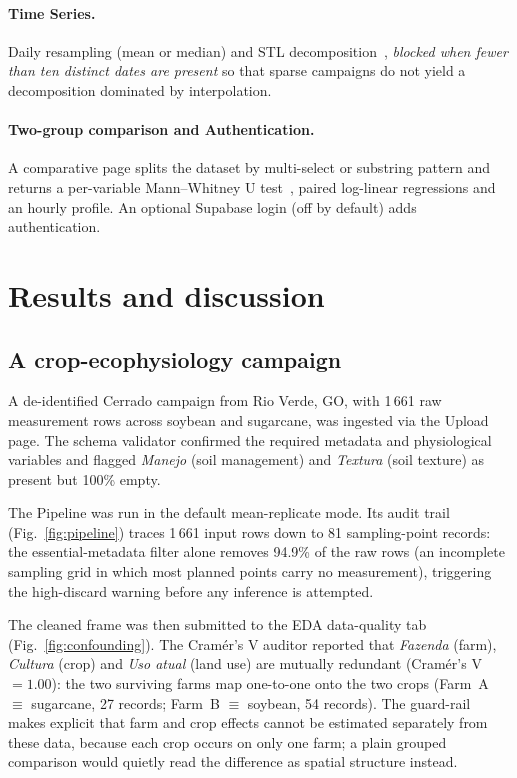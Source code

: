 \documentclass[11pt, letterpaper]{article}
\begin{document}
\paragraph{Time Series.} Daily resampling (mean or median) and STL decomposition~\cite{Cleveland1990STL}, \emph{blocked when fewer than ten distinct dates are present} so that sparse campaigns do not yield a decomposition dominated by interpolation.

\paragraph{Two-group comparison and Authentication.} A comparative page splits the dataset by multi-select or substring pattern and returns a per-variable Mann--Whitney U test~\cite{Mann1947}, paired log-linear regressions and an hourly profile. An optional Supabase login (off by default) adds authentication.

\section{Results and discussion}\label{sec:examples}

\subsection{A crop-ecophysiology campaign}\label{sec:ex-physio}

A de-identified Cerrado campaign from Rio Verde, GO, with 1\,661 raw measurement rows across soybean and sugarcane, was ingested via the Upload page. The schema validator confirmed the required metadata and physiological variables and flagged \emph{Manejo} (soil management) and \emph{Textura} (soil texture) as present but 100\% empty.

The Pipeline was run in the default mean-replicate mode. Its audit trail (Fig.~\ref{fig:pipeline}) traces 1\,661 input rows down to 81 sampling-point records: the essential-metadata filter alone removes 94.9\% of the raw rows (an incomplete sampling grid in which most planned points carry no measurement), triggering the high-discard warning before any inference is attempted.

The cleaned frame was then submitted to the EDA data-quality tab (Fig.~\ref{fig:confounding}). The Cram\'er's V auditor reported that \emph{Fazenda} (farm), \emph{Cultura} (crop) and \emph{Uso atual} (land use) are mutually redundant (Cram\'er's V $=1.00$): the two surviving farms map one-to-one onto the two crops (Farm~A $\equiv$ sugarcane, 27 records; Farm~B $\equiv$ soybean, 54 records). The guard-rail makes explicit that farm and crop effects cannot be estimated separately from these data, because each crop occurs on only one farm; a plain grouped comparison would quietly read the difference as spatial structure instead.
\end{document}
